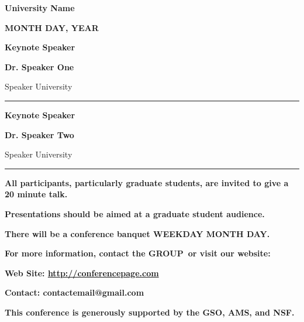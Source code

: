 \documentclass{article}	%
\makeatletter
\newcommand{\universityname}{University Name}
\newcommand{\conferencedate}{MONTH DAY, YEAR}
\newcommand{\dinnerdate}{WEEKDAY MONTH DAY}
\newcommand{\openspeakername}{Dr. Speaker One}
\newcommand{\openspeakeruniversity}{Speaker University}
\newcommand{\keynotespeakername}{Dr. Speaker Two}
\newcommand{\keynotespeakeruniversity}{Speaker University}
\newcommand{\conferencepage}{\url{http://conferencepage.com}}
\newcommand{\contactname}{GROUP} %
\newcommand{\contactemail}{contactemail@gmail.com}
\makeatother
\begin{document}
\begin{minipage}[l][.7\textheight][t]{.90\linewidth} \centering \vspace{-1.5in}
\fontsize{42}{45} \selectfont  
\textbf{\universityname} \par
\fontsize{38}{40} \selectfont  
\textbf{\conferencedate} \par\vspace{1in}
\fontsize{28}{30} \selectfont  


\textbf{Keynote Speaker} \par
\fontsize{38}{40} \selectfont  
\textbf{\openspeakername} \par\vspace{0.3cm}
\fontsize{18}{20} \selectfont  
\textsf{\openspeakeruniversity} \par\vspace{1.5cm}
\rule{0.65\textwidth}{0.1cm} \par\vspace{1.5cm}
\fontsize{28}{30 } \selectfont  

\textbf{Keynote Speaker} \par
\fontsize{38}{40} \selectfont  
\textbf{\keynotespeakername} \par\vspace{0.3cm}
\fontsize{18}{20} \selectfont  
\textsf{\keynotespeakeruniversity} \par\vspace{1.5cm}
\rule{0.65\textwidth}{0.1cm} \par\vspace{0.8cm}


\fontsize{10}{15} \selectfont  
\begin{center}
\fontsize{11}{11}
\textbf{All participants, particularly graduate students, are invited to give a 20 minute talk.} \par
\textbf{Presentations should be aimed at a graduate student audience.} \par
\textbf{There will be a conference banquet \dinnerdate.} \par
\textbf{For more information, contact the \contactname\ or visit our website:} \par
\textbf{Web Site: \conferencepage} \par

\textbf{Contact: \contactemail} \par\vspace{2cm}

\textbf{This conference is generously supported by the GSO, AMS, and NSF.} \hspace{4.5cm} \phantom{x}
\end{center}
\end{minipage}


\clearpage
\end{document}
